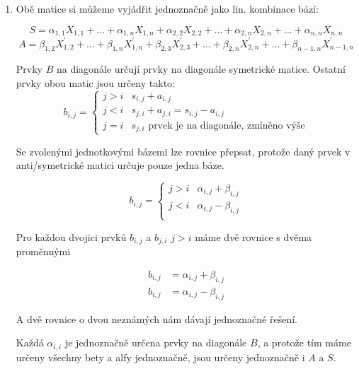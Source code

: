 \documentclass[10pt,a4paper]{article}
\begin{document}
\begin{enumerate}[label=\roman*]
\begin{itemize}
\end{itemize}
\item Obě matice si můžeme vyjádřit jednoznačně jako lin. kombinace bází:

\begin{equation*}
S = 
\alpha_{1,1} X_{1,1} + ... + \alpha_{1,n} X_{1,n} +
\alpha_{2,2} X_{2,2} + ... + \alpha_{2,n} X_{2,n} +
... + 
\alpha_{n,n} X_{n,n} 
\end{equation*}
\begin{equation*}
A = 
\beta_{1,2} X^\prime_{1,2} + ... + \beta_{1,n} X^\prime_{1,n} +
\beta_{2,3} X^\prime_{2,3} + ... + \beta_{2,n} X^\prime_{2,n} +
... + 
\beta_{n-1,n} X^\prime_{n-1,n} 
\end{equation*}

Prvky $B$ na diagonále určují prvky na diagonále symetrické matice. Ostatní prvky obou matic jsou určeny takto:
\begin{equation*}
b_{i,j} = \begin{cases}
j > i & s_{i,j} + a_{i,j} \\
j < i & s_{j,i} + a_{j,i} = s_{i,j} - a_{i,j} \\
j = i & s_{j,i} \text{ prvek je na diagonále, zmíněno výše}
\end{cases}
\end{equation*}

Se zvolenými jednotkovými bázemi lze rovnice přepsat, protože daný prvek v anti/symetrické matici určuje pouze jedna báze.

\begin{equation*}
b_{i,j} = \begin{cases}
j > i & \alpha_{i,j} + \beta_{i,j} \\
j < i & \alpha_{i,j} - \beta_{i,j} \\
\end{cases}
\end{equation*}

Pro každou dvojici prvků $b_{i,j}$ a $b_{j, i}$ $j > i$ máme dvě rovnice s dvěma proměnnými 

\begin{align*}
b_{i,j} &= \alpha_{i,j} + \beta_{i,j}\\
b_{i,j} &= \alpha_{i,j} - \beta_{i,j}
\end{align*}


A dvě rovnice o dvou neznámých nám dávají jednoznačné řešení.

Každá $\alpha_{i,i}$ je jednoznačně určena prvky na diagonále $B$, a protože tím máme určeny všechny bety a alfy jednoznačně, jsou určeny jednoznačně i $A$ a $S$.

\end{enumerate}
\end{document}
